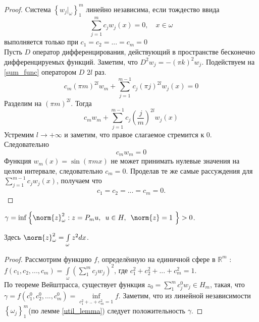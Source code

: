 \begin{proof}
Cистема $\left\{ w_j|_{\omega} \right\}^m_1$ линейно независима, если тождество ввида
\begin{equation}\label{sum_func}
	\sum \limits_{j = 1}^m{c_j w_j(x)} = 0, \quad x \in \omega
\end{equation}
выполняется только при $c_1 = c_2 = ... = c_m = 0$\\

Пусть $D$ оператор дифференцирования, действующий в пространстве бесконечно дифференцируемых функций.
Заметим, что $D^2 w_j = -(\pi k)^2 w_j$. Подействуем  на \eqref{sum_func} оператором $D$ $2l$ раз.
\begin{equation*}
	c_m (\pi m)^{2l} w_m + \sum \limits_{j = 1}^{m - 1}{c_j (\pi j)^{2l} w_j(x)} = 0
\end{equation*}
Разделим на $(\pi m)^{2l}$. Тогда
\begin{equation*}
	c_m w_m + \sum \limits_{j = 1}^{m - 1}{c_j \left(\frac{j}{m}\right)^{2l} w_j(x)}
\end{equation*}
Устремим $l \rightarrow +\infty$ и заметим, что правое слагаемое стремится к 0.\\ 
Следовательно
\begin{equation*}
	c_m w_m = 0
\end{equation*}
Функция $w_m(x) = \sin{(\pi m x)}$ не может принимать нулевые значения на целом интервале, следовательно $c_m = 0$. Проделав те же самые рассуждения для $\sum \limits_{j = 1}^{m - 1}{c_j w_j(x)}$, получаем что 
\begin{equation*}
	c_1 = c_2 = ... = c_m = 0.
\end{equation*}
\end{proof}
\par
\vspace{2ex}
\begin{lemma}\label{main_lemma}
$\gamma = \inf{ \left\{ \norm{z}^2_{\omega} : z = P_mu,\enskip u \in H, \enskip \norm{z} = 1 \ \right\} } > 0$.\\
\par Здесь $\norm{z}^2_{\omega} = \int\limits_{\omega}{z^2dx}$.
\end{lemma}
\begin{proof}
Рассмотрим функцию $f$, определённую на единичной сфере в $\mathbb{R}^m$ :\\
$f(c_1, c_2, ..., c_m) = \int \limits_{\omega} {(\sum\limits_1^m {c_j w_j})^2}$, где $c_1^2 + c_2^2 + ... + c^2_m = 1$.\\
По теореме Вейштрасса, существует функция $z_0 = \sum\limits_1^m {c_j^0 w_j} \in H_m$, такая, что \\
$\gamma = f(c_1^0, c_2^0, ..., c_m^0) = \inf \limits_{c_1^2 + .. + c_m^2 = 1} {f}$. Заметим, что из линейной независимости $\left\{ \omega_j \right\}^m_1$(по лемме \ref{util_lemma}) следует положительность $\gamma$.
\end{proof}
